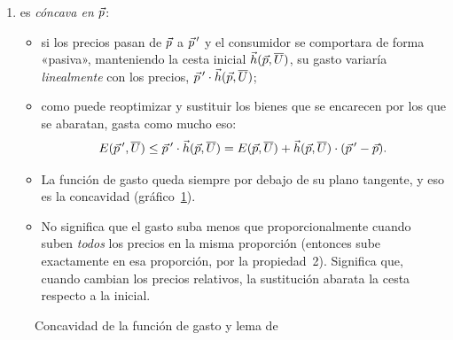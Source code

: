 \documentclass[11pt]{article}
\begin{document}
\begin{itemize}
\begin{enumerate}
  \item es \emph{cóncava en $\vec{p}$}:
    \begin{itemize}
    \item si los precios pasan de $\vec{p}$ a $\vec{p}\,'$ y el consumidor se comportara de forma «pasiva», manteniendo la cesta inicial $\vec{h}(\vec{p},\overline{U})$, su gasto variaría \emph{linealmente} con los precios, $\vec{p}\,'\cdot\vec{h}(\vec{p},\overline{U})$;
    \item como puede reoptimizar y sustituir los bienes que se encarecen por los que se abaratan, gasta como mucho eso:
      \begin{equation}
      E(\vec{p}\,',\overline{U})\leq \vec{p}\,'\cdot\vec{h}(\vec{p},\overline{U})=E(\vec{p},\overline{U})+\vec{h}(\vec{p},\overline{U})\cdot(\vec{p}\,'-\vec{p}). \label{eq:concavidad-fg}
      \end{equation}
    \item La función de gasto queda siempre por debajo de su plano tangente, y eso es la concavidad (gráfico~\ref{fig:concavidad-fg}).
    \item No significa que el gasto suba menos que proporcionalmente cuando suben \emph{todos} los precios en la misma proporción (entonces sube exactamente en esa proporción, por la propiedad~2). Significa que, cuando cambian los precios relativos, la sustitución abarata la cesta respecto a la inicial.
    \end{itemize}
  \end{enumerate}
\end{itemize}

\begin{figure}[H]
\centering
\caption{Concavidad de la función de gasto y lema de }\label{fig:concavidad-fg}
\end{figure}
\end{document}

